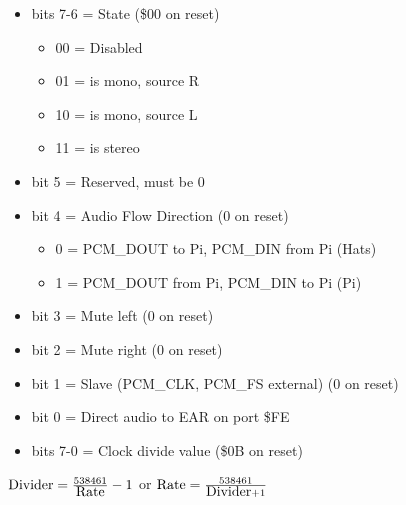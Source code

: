 \begin{itemize}
\item bits 7-6 = \iis State (\$00 on reset)
  \begin{itemize}
  \item 00 = \iis Disabled
  \item 01 = \iis is mono, source R
  \item 10 = \iis is mono, source L
  \item 11 = \iis is stereo
  \end{itemize}
\item bit 5 = Reserved, must be 0
\item bit 4 = Audio Flow Direction (0 on reset)
  \begin{itemize}
  \item 0 = PCM\_DOUT to Pi, PCM\_DIN from Pi (Hats)
  \item 1 = PCM\_DOUT from Pi, PCM\_DIN to Pi (Pi)
  \end{itemize}
\item bit 3 = Mute left (0 on reset)
\item bit 2 = Mute right (0 on reset)
\item bit 1 = Slave (PCM\_CLK, PCM\_FS external) (0 on reset)
\item bit 0 = Direct \iis audio to EAR on port \$FE
\end{itemize}

\begin{itemize}
\item bits 7-0 = Clock divide value (\$0B on reset)
\end{itemize}
$\hbox{Divider}=\frac{538461}{\hbox{Rate}}-1$ or $\hbox{Rate}=\frac{538461}{\hbox{Divider}+1}$

